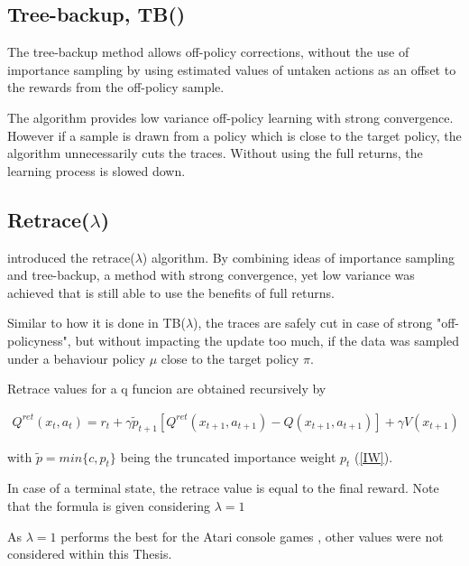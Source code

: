 \subsection{Tree-backup, TB(\lambda)}

The tree-backup method allows off-policy corrections, without the use of importance sampling by using estimated values of untaken actions as an offset to the rewards from the off-policy sample. \citet{Precup00}

The algorithm provides low variance off-policy learning with strong convergence.
However if a sample is drawn from a policy which is close to the target policy, the algorithm unnecessarily cuts the traces. Without using the full returns, the learning process is slowed down.
\pagebreak
\subsection{Retrace($\lambda$)}

\citet{Munos16} introduced the retrace($\lambda$) algorithm. By combining ideas of importance sampling and tree-backup, a method with strong convergence, yet low variance was achieved that is still able to use the benefits of full returns.

Similar to how it is done in TB($\lambda$), the traces are safely cut in case of strong "off-policyness", but without impacting the update too much, if the data was sampled under a behaviour policy $\mu$ close to the target policy $\pi$.

Retrace values for a q funcion are obtained recursively by

\begin{align}
{
Q^{ret}(x_t,a_t)=r_t+\gamma \tilde{p}_{t+1} [Q^{ret}(x_{t+1},a_{t+1} ) -  Q(x_{t+1},a_{t+1})] + \gamma V(x_{t+1})
}
\label{qretrace}
\end{align}

with $\tilde{p} = min\{c,p_t\}$ being the truncated importance weight $p_t$ (\ref{IW}).

In case of a terminal state, the retrace value is equal to the final reward.
Note that the formula is given considering $\lambda = 1$

As $\lambda = 1$ performs the best for the Atari console games \citep{Munos16}, other values were not considered within this Thesis.

\pagebreak

